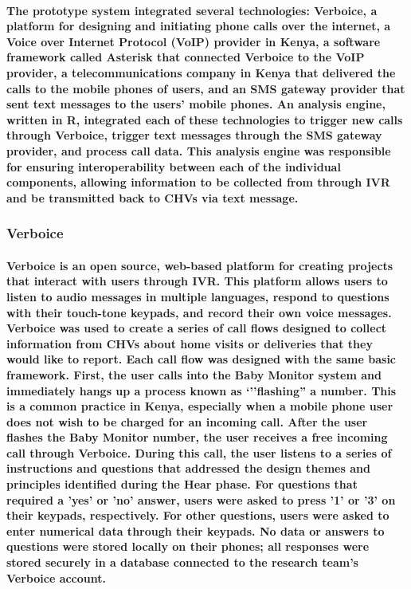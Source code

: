 \paragraph{The prototype system integrated several technologies: Verboice, a platform for designing and initiating phone calls over the internet, a Voice over Internet Protocol (VoIP) provider in Kenya, a software framework called Asterisk that connected Verboice to the VoIP provider, a telecommunications company in Kenya that delivered the calls to the mobile phones of users, and an SMS gateway provider that sent text messages to the users' mobile phones. An analysis engine, written in R, integrated each of these technologies to trigger new calls through Verboice, trigger text messages through the SMS gateway provider, and process call data. This analysis engine was responsible for ensuring interoperability between each of the individual components, allowing information to be collected from through IVR and be transmitted back to CHVs via text message. }

\subsubsection{Verboice}

\paragraph{Verboice is an open source, web-based platform for creating projects that interact with users through IVR. This platform allows users to listen to audio messages in multiple languages, respond to questions with their touch-tone keypads, and record their own voice messages. Verboice was used to create a series of call flows designed to collect information from CHVs about home visits or deliveries that they would like to report. Each call flow was designed with the same basic framework. First, the user calls into the Baby Monitor system and immediately hangs up \textemdash   a process known as `''flashing'' a number. This is a common practice in Kenya, especially when a mobile phone user does not wish to be charged for an incoming call. After the user flashes the Baby Monitor number, the user receives a free incoming call through Verboice. During this call, the user listens to a series of instructions and questions that addressed the design themes and principles identified during the Hear phase. For questions that required a 'yes' or 'no' answer, users were asked to press '1' or '3' on their keypads, respectively. For other questions, users were asked to enter numerical data through their keypads. No data or answers to questions were stored locally on their phones; all responses were stored securely in a database connected to the research team's Verboice account. }

